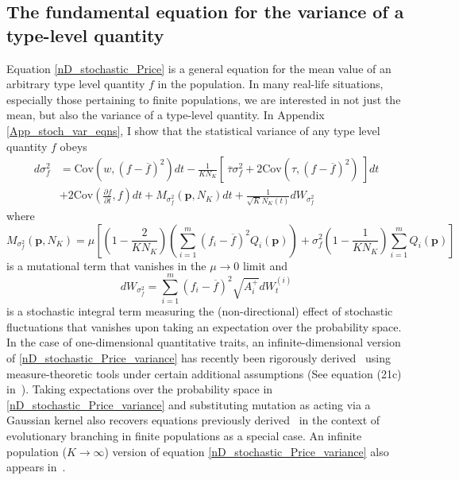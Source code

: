 \subsection{The fundamental equation for the variance of a type-level quantity}\label{sec_fun_theorems_var}
Equation \eqref{nD_stochastic_Price} is a general equation for the mean value of an arbitrary type level quantity $f$ in the population. In many real-life situations, especially those pertaining to finite populations, we are interested in not just the mean, but also the variance of a type-level quantity. In Appendix \ref{App_stoch_var_eqns}, I show that the statistical variance of any type level quantity $f$ obeys
\begin{equation}
\label{nD_stochastic_Price_variance}
\begin{aligned}
d\sigma^2_{f} &= \textrm{Cov}\left(w,(f - \overline{f})^2\right)dt - \frac{1}{KN_K}\left[ \ \overline{\tau}\sigma^2_{f} +  2\textrm{Cov}\left(\tau,(f - \overline{f})^2\right) \ \right]dt\\[12pt]
& + 2\textrm{Cov}\left(\frac{\partial f}{\partial t},f\right)dt + M_{\sigma^2_f}(\mathbf{p},N_K)dt + \frac{1}{\sqrt{K}N_{K}(t)}dW_{\sigma^2_{f}}
\end{aligned}
\end{equation}
where
\begin{equation}
\label{variance_price_mutation_term}
M_{\sigma^2_f}(\mathbf{p},N_K) = \mu\left[\left(1 - \frac{2}{KN_K}\right)\left(\sum\limits_{i=1}^{m}(f_i - \overline{f})^2Q_i(\mathbf{p})\right) + \sigma^2_f\left(1 - \frac{1}{KN_K}\right)\sum\limits_{i=1}^{m}Q_i(\mathbf{p})\right]
\end{equation}
is a mutational term that vanishes in the $\mu \to 0$ limit and
\begin{equation}
\label{variance_price_diffusion_term}
dW_{\sigma^2_f} = \sum\limits_{i=1}^{m}\left(f_i - \overline{f}\right)^2\sqrt{A_i^+}dW_{t}^{(i)}
\end{equation}
is a stochastic integral term measuring the (non-directional) effect of stochastic fluctuations that vanishes upon taking an expectation over the probability space. In the case of one-dimensional quantitative traits, an infinite-dimensional version of \eqref{nD_stochastic_Price_variance} has recently been rigorously derived~\citep{week_white_2021} using measure-theoretic tools under certain additional assumptions (See equation (21c) in~\cite{week_white_2021}). Taking expectations over the probability space in \eqref{nD_stochastic_Price_variance} and substituting mutation as acting via a Gaussian kernel also recovers equations previously derived~\citep{debarre_evolutionary_2016} in the context of evolutionary branching in finite populations as a special case. An infinite population ($K \to \infty$) version of equation \eqref{nD_stochastic_Price_variance} also appears in~\cite{lion_theoretical_2018}.

